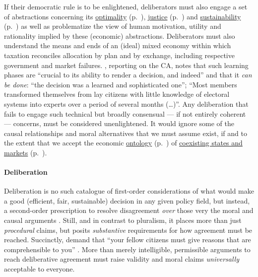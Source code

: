 If their democratic rule is to be enlightened, deliberators must also engage a set of abstractions concerning its \hyperref[sec:tax-optimality]{optimality} (p.~\pageref{sec:tax-optimality}), \hyperref[sec:tax-justice]{justice} (p.~\pageref{sec:tax-justice}) and \hyperref[sec:tax-sustainability]{sustainability} (p.~\pageref{sec:tax-sustainability}) as well as problematize the view of human motivation, utility and rationality implied by these (economic) abstractions.
Deliberators must also understand the means and ends of an (ideal) mixed economy within which taxation reconciles allocation by plan and by exchange, including respective government and market failures.
\cite[K1513]{Warren2008}, reporting on the \gls{CA}, notes that such learning phases are ``crucial to its ability to  render a decision, and indeed'' and that it \emph{can be done}: ``the decision was a learned and sophisticated one''; 
``Most members transformed themselves from lay citizens with little knowledge of electoral systems into experts over a period of several months (\ldots)''.
Any deliberation that fails to engage such technical but broadly consensual --- if not entirely coherent --- concerns, must be considered unenlightened. 
It would ignore some of the causal relationships and moral alternatives that we must assume exist, if and to the extent that we accept the economic \hyperref[sec:ontology]{ontology} (p.~\pageref{sec:ontology}) of \hyperref[chap:mixed-economy]{coexisting states and markets} (p.~\pageref{chap:mixed-economy}).

\paragraph{Deliberation}
Deliberation is no such catalogue of first-order considerations of what would make a good (efficient, fair, sustainable) decision in any given policy field, but instead, a second-order prescription to resolve disagreement \emph{over} those very the moral and causal arguments \citep[125]{GutmannThompson-2004-aa}.
Still, and in contrast to pluralism, it places more than just \emph{procedural} claims, but posits \emph{substantive} requirements for how agreement must be reached.
Succinctly, \citeauthor{GutmannThompson-2004-aa} demand that ``your fellow citizens must give reasons that are comprehensible to you'' \citeyearpar[K177]{GutmannThompson-2004-aa}.
More than merely intelligible, permissible arguments to reach deliberative agreement must raise validity \citep{Habermas-1984-aa} and moral \citep{Rawls-1971-aa} claims \emph{universally} acceptable to everyone.

